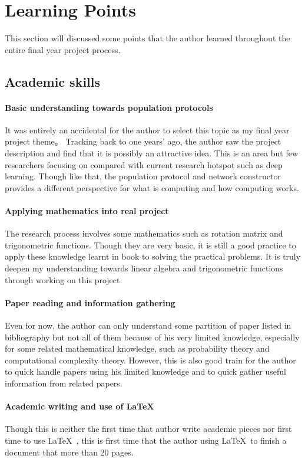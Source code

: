 \section{Learning Points}
This section will discussed some points that the author learned throughout the entire final year project process.
\subsection{Academic skills}
\paragraph{Basic understanding towards population protocols}
It was entirely an accidental for the author to select this topic as my final year project theme。
Tracking back to one years' ago, the author saw the project description and find that it is possibly an attractive idea.
This is an area but few researchers focusing on compared with current research hotspot such as deep learning.
Though like that, the population protocol and network constructor provides a different perspective for what is computing and how computing works.

\paragraph{Applying mathematics into real project}
The research process involves some mathematics such as rotation matrix and trigonometric functions.
Though they are very basic, it is still a good practice to apply these knowledge learnt in book to solving the practical problems. It is truly
deepen my understanding towards linear algebra and trigonometric functions through working on this project.

\paragraph{Paper reading and information gathering}
Even for now, the author can only understand some partition of paper listed in bibliography but not all of them
because of his very limited knowledge, especially for some related mathematical knowledge, such as probability theory and
computational complexity theory.
However, this is also good train for the author to quick handle papers using his limited knowledge and to quick
gather useful information from related papers.

\paragraph{Academic writing and use of \LaTeX\ }
Though this is neither the first time that author write academic pieces nor first time
to use \LaTeX\ , this is first time that the author using \LaTeX\ to finish a document that
more than 20 pages.


